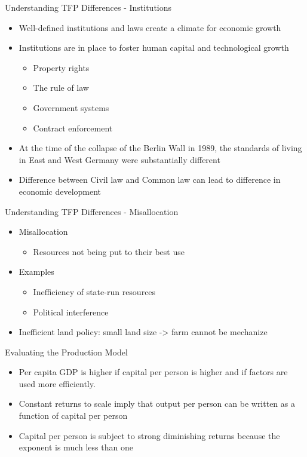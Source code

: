\documentclass[aspectratio=1610]{beamer}
\begin{document}
\begin{frame}[wide]{Understanding TFP Differences - Institutions}
	\begin{itemize}
		\item Well-defined institutions and laws create a climate for economic growth
		\item Institutions are in place to foster human capital and technological growth
		\begin{itemize}
			\item Property rights
			\item The rule of law
			\item Government systems
			\item Contract enforcement
		\end{itemize}
		\item At the time of the collapse of the Berlin Wall in 1989, the standards of living in East and West Germany were substantially different
		\item Difference between Civil law and Common law can lead to difference in economic development
	\end{itemize}
\end{frame}

\begin{frame}[wide]{Understanding TFP Differences - Misallocation}
	\begin{itemize}
		\item Misallocation
		\begin{itemize}
			\item Resources not being put to their best use
		\end{itemize}
		\item Examples
		\begin{itemize}
			\item Inefficiency of state-run resources
			\item Political interference
		\end{itemize}
		\item Inefficient land policy: small land size -> farm cannot be mechanize 
	\end{itemize}
\end{frame}

\begin{frame}[wide]{Evaluating the Production Model}
	\begin{itemize}
		\item Per capita GDP is higher if capital per person is higher and if factors are used more efficiently.
		\item Constant returns to scale imply that output per person can be written as a function of capital per person
		\item Capital per person is subject to strong diminishing returns because the exponent is much less than one
	\end{itemize}
\end{frame}
\end{document}
